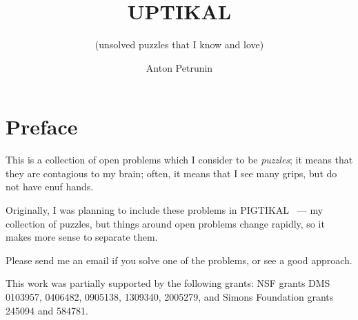 \documentclass[twoside]{book}
\begin{document}

\title{UPTIKAL}
\subtitle{(unsolved puzzles that I know and love)}
\author{Anton Petrunin}
\date{}
\maketitle




\newpage
\thispagestyle{empty}
\section*{Preface}

This is a collection of open problems which I consider to be \emph{puzzles};
it means that they are contagious to my brain;
often, it means that I see many grips, but do not have enuf hands.

Originally, I was planning to include these problems in PIGTIKAL~\cite{petrunin2021pigtikal} --- my collection of puzzles,
but things around open problems change rapidly, so it makes more sense to separate them.

Please send me an email if you solve one of the problems, or see a good approach.


This work was partially supported by the following grants:
NSF grants DMS 
0103957,
0406482,
0905138,
1309340,
2005279,
and Simons Foundation grants 
245094 and 584781.

\null\vfill{}






\backmatter
\newpage
{}
{\scriptsize

}
\sloppy
\printbibliography[heading=bibintoc]
\fussy
\end{document}
